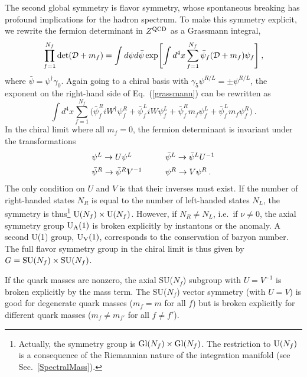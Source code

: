 The second global symmetry is flavor symmetry, whose spontaneous
breaking has profound implications for the hadron spectrum.  To make
this symmetry explicit, we rewrite the fermion determinant in $Z^{\rm
  QCD}$ as a Grassmann integral,
\begin{equation}
  \label{grassmann}
  \prod_{f=1}^{N_f}\det({\cal D}+m_f)=\int d\psi d\bar\psi\exp\Biggl[
  \int d^4x\sum_{f=1}^{N_f}\bar\psi_f({\cal D}+m_f)\psi_f\Biggr]\:,
\end{equation}
where $\bar \psi = \psi^\dagger \gamma_0$.  Again going to a chiral
basis with $\gamma_5\psi^{R/L}=\pm\psi^{R/L}$, the exponent on the
right-hand side of Eq.~(\ref{grassmann}) can be rewritten as
\begin{equation}
  \int d^4x \sum_{f=1}^{N_f}\Bigr(\bar\psi^R_f{iW^\dagger}\psi^R_f +
  \bar\psi^L_f{iW}\psi^L_f + \bar\psi^R_fm_f\psi^L_f +
  \bar\psi^L_fm_f\psi^R_f \Bigr)\:.
\end{equation}
In the chiral limit where all $m_f=0$, the fermion determinant is
invariant under the transformations
\begin{eqnarray}
\begin{array}{l@{\hspace*{10mm}}l}
    \psi^L\to U\psi^L & \bar\psi^L\to\bar\psi^LU^{-1}\\[2mm]
    \bar\psi^R\to\bar\psi^R V^{-1} & \psi^R\to V\psi^R\:.
  \end{array}  
\end{eqnarray}
The only condition on $U$ and $V$ is that their inverses must exist.
If the number of right-handed states $N_R$ is equal to the number of
left-handed states $N_L$, the symmetry is thus\footnote{Actually, the
  symmetry group is ${\rm Gl}(N_f) \times {\rm Gl}(N_f)$. The
  restriction to ${\rm U}(N_f)$ is a consequence of the Riemannian
  nature of the integration manifold (see Sec.~\ref{SpectralMass}).}
${\rm U}(N_f)\times{\rm U}(N_f)$.  However, if $N_R\ne N_L$, i.e.\ if
$\nu\ne0$, the axial symmetry group $\rm U_A(1)$ is broken explicitly
by instantons or the anomaly.  A second U(1) group, $\rm U_V(1)$,
corresponds to the conservation of baryon number.  The full flavor
symmetry group in the chiral limit is thus given by $G = {\rm
  SU}(N_f)\times {\rm SU}(N_f)$.  

If the quark masses are nonzero, the axial SU($N_f$) subgroup with
$U=V^{-1}$ is broken explicitly by the mass term.  The SU($N_f$)
vector symmetry (with $U=V$) is good for degenerate quark masses
($m_f=m$ for all $f$) but is broken explicitly for different quark
masses ($m_f\ne m_{f'}$ for all $f\ne f'$).

